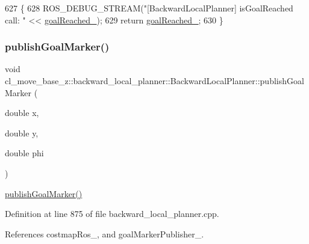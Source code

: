 \begin{DoxyCode}
627         \{
628             ROS\_DEBUG\_STREAM(\textcolor{stringliteral}{"[BackwardLocalPlanner] isGoalReached call: "} << 
      \hyperlink{classcl__move__base__z_1_1backward__local__planner_1_1BackwardLocalPlanner_ad443c52ef585a8eab0364f0909222f51}{goalReached\_});
629             \textcolor{keywordflow}{return} \hyperlink{classcl__move__base__z_1_1backward__local__planner_1_1BackwardLocalPlanner_ad443c52ef585a8eab0364f0909222f51}{goalReached\_};
630         \}
\end{DoxyCode}
\mbox{\label{classcl__move__base__z_1_1backward__local__planner_1_1BackwardLocalPlanner_a70eaeb6cf31fd3378d9fbf9bcb975995}} 
\subsubsection{\texorpdfstring{publish\+Goal\+Marker()}{publishGoalMarker()}}
{\footnotesize\ttfamily void cl\+\_\+move\+\_\+base\+\_\+z\+::backward\+\_\+local\+\_\+planner\+::\+Backward\+Local\+Planner\+::publish\+Goal\+Marker (\begin{DoxyParamCaption}\item[{double}]{x,  }\item[{double}]{y,  }\item[{double}]{phi }\end{DoxyParamCaption})\hspace{0.3cm}{\ttfamily [private]}}

\hyperlink{classcl__move__base__z_1_1backward__local__planner_1_1BackwardLocalPlanner_a70eaeb6cf31fd3378d9fbf9bcb975995}{publish\+Goal\+Marker()} 

Definition at line 875 of file backward\+\_\+local\+\_\+planner.\+cpp.



References costmap\+Ros\+\_\+, and goal\+Marker\+Publisher\+\_\+.



